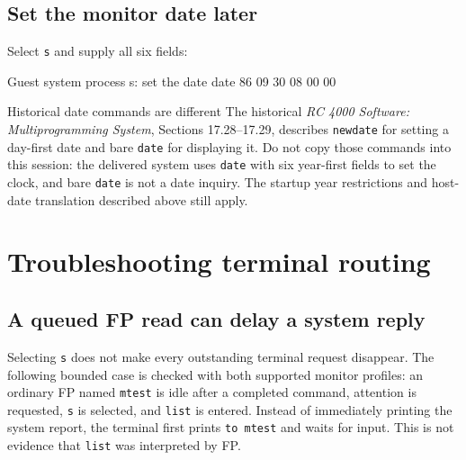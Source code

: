 \begin{procedureblock}
\section{Set the monitor date later}\label{set-the-monitor-date-later}

Select \passthrough{\lstinline!s!} and supply all six fields:

\begin{commandexample}{Guest system process s: set the date}
date 86 09 30 08 00 00
\end{commandexample}

\begin{operationnote}{Historical date commands are different}
The historical \textit{RC 4000 Software: Multiprogramming System},
Sections 17.28--17.29, describes \passthrough{\lstinline!newdate!} for
setting a day-first date and bare \passthrough{\lstinline!date!} for
displaying it. Do not copy those commands into this session: the delivered
system uses \passthrough{\lstinline!date!} with six year-first fields to
set the clock, and bare \passthrough{\lstinline!date!} is not a date inquiry.
The startup year restrictions and host-date translation described above
still apply.
\end{operationnote}
\end{procedureblock}

\section{Troubleshooting terminal routing}

\subsection{A queued FP read can delay a system reply}\label{a-queued-fp-read-can-delay-a-system-reply}

Selecting \passthrough{\lstinline!s!} does not make every outstanding terminal request disappear. The following bounded case is checked with both supported monitor profiles: an ordinary FP named \passthrough{\lstinline!mtest!} is idle after a completed command, attention is requested, \passthrough{\lstinline!s!} is selected, and \passthrough{\lstinline!list!} is entered. Instead of immediately printing the system report, the terminal first prints \passthrough{\lstinline!to mtest!} and waits for input. This is not evidence that \passthrough{\lstinline!list!} was interpreted by FP.

